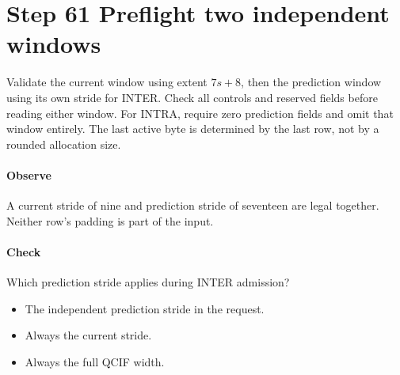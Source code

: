 \section{Step 61 Preflight two independent windows}\label{h263-block-s01}
Validate the current window using extent $7s+8$, then the prediction window
using its own stride for INTER. Check all controls and reserved fields before
reading either window. For INTRA, require zero prediction fields and omit that
window entirely. The last active byte is determined by the last row, not by a
rounded allocation size.

\paragraph{Observe} A current stride of nine and prediction stride of seventeen
are legal together. Neither row's padding is part of the input.
\paragraph{Check} Which prediction stride applies during INTER admission?
\begin{itemize}
  \item[A.] The independent prediction stride in the request.
  \item[B.] Always the current stride.
  \item[C.] Always the full QCIF width.
\end{itemize}
